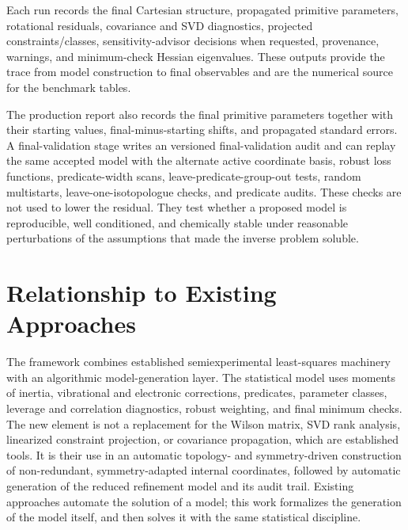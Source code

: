 \documentclass[aip,jcp,reprint,longbibliography,floatfix]{revtex4-2}
\begin{document}
Each run records the final Cartesian structure, propagated primitive
parameters, rotational residuals, covariance and SVD diagnostics, projected
constraints/classes, sensitivity-advisor decisions when requested, provenance,
warnings, and minimum-check Hessian eigenvalues. These outputs provide the
trace from model construction to final observables and are the numerical
source for the benchmark tables.

The production report also records the final primitive parameters together
with their starting values, final-minus-starting shifts, and propagated
standard errors. A final-validation stage writes an
versioned final-validation audit and can replay the same
accepted model with the alternate active coordinate basis, robust loss
functions, predicate-width scans, leave-predicate-group-out tests, random
multistarts, leave-one-isotopologue checks, and predicate audits. These checks
are not used to lower the residual. They test whether a proposed model is
reproducible, well conditioned, and chemically stable under reasonable
perturbations of the assumptions that made the inverse problem soluble.


\section{Relationship to Existing Approaches}

The framework combines established semiexperimental least-squares
machinery\cite{Demaison2011EquilibriumStructures,Mendolicchio2017MSR,Bartell1975Predicate,Mendolicchio2025FastDvib}
with an algorithmic model-generation layer. The statistical model
uses moments of inertia, vibrational and electronic corrections, predicates,
parameter classes, leverage and correlation diagnostics, robust weighting, and
final minimum checks. The new element is not a replacement for the Wilson
matrix, SVD rank analysis, linearized constraint projection, or covariance
propagation, which are established tools. It is their use in an automatic
topology- and symmetry-driven construction of non-redundant, symmetry-adapted
internal coordinates, followed by automatic generation of the reduced
refinement model and its audit trail. Existing approaches automate the solution
of a model; this work formalizes the generation of the model itself, and then
solves it with the same statistical discipline.
\end{document}
